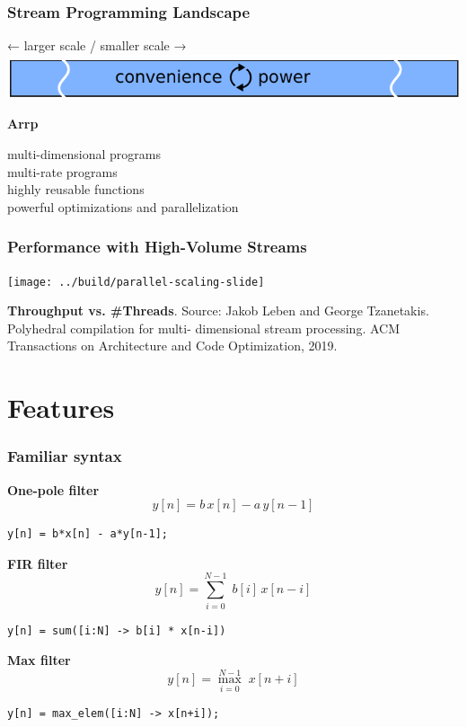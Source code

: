 \documentclass{beamer}
\begin{document}
\begin{frame}[t, fragile]
\frametitle{Stream Programming Landscape}

\begin{center}
← larger scale / smaller scale →
\includegraphics{../figures/landscape_after_arrp}
\end{center}
\begin{center}
\textbf{Arrp}

\vspace{10pt}
multi-dimensional programs\\
multi-rate programs\\
highly reusable functions\\
powerful optimizations and parallelization
\end{center}
\end{frame}

\begin{frame}[fragile]
\frametitle{Performance with High-Volume Streams}
\texttt{[image: ../build/parallel-scaling-slide]}

\footnotesize
\textbf{Throughput vs. \#Threads}. Source: Jakob Leben and George Tzanetakis. Polyhedral compilation for multi-
dimensional stream processing. ACM Transactions on Architecture and Code
Optimization, 2019.
\end{frame}

\section{Features}

\begin{frame}[fragile]
\frametitle{Familiar syntax}

\textbf{One-pole filter}
\[y[n] = b\,x[n] - a\,y[n-1]\]
\begin{center}
\begin{BVerbatim}
y[n] = b*x[n] - a*y[n-1];
\end{BVerbatim}
\end{center}

\textbf{FIR filter}
\[y[n] = \sum_{i = 0}^{N-1} \; b[i]\,x[n-i]\]
\begin{center}
\begin{BVerbatim}
y[n] = sum([i:N] -> b[i] * x[n-i])
\end{BVerbatim}
\end{center}

\textbf{Max filter}
\[y[n] = \max_{i = 0}^{N-1} \; x[n+i]\]
\begin{center}
\begin{BVerbatim}
y[n] = max_elem([i:N] -> x[n+i]);
\end{BVerbatim}
\end{center}

\end{frame}
\end{document}
